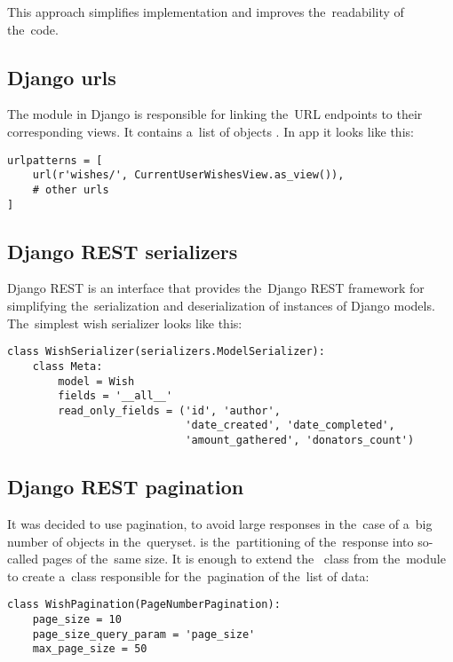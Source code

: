 This approach simplifies implementation and improves the~readability of the~code.


\subsection{Django urls}
The  module in Django is responsible for linking the~\ac{URL} endpoints to their corresponding views.
It contains a~list of objects . In  app it looks like this:

\begin{lstlisting}
urlpatterns = [
    url(r'wishes/', CurrentUserWishesView.as_view()),
    # other urls
]
\end{lstlisting}


\subsection{Django REST serializers}
Django REST  is an interface that provides the~Django REST framework for simplifying
the~serialization and deserialization of instances of Django models. The~simplest wish serializer looks like this:

\begin{lstlisting}
class WishSerializer(serializers.ModelSerializer):
    class Meta:
        model = Wish
        fields = '__all__'
        read_only_fields = ('id', 'author',
                            'date_created', 'date_completed',
                            'amount_gathered', 'donators_count')
\end{lstlisting}
\pagebreak

\subsection{Django REST pagination}
It was decided to use pagination, to avoid large responses in the~case of a~big number of objects in the~queryset.
 is the~partitioning of the~response into so-called pages of the~same size. It is enough to
extend the~ class from the~module  to create
a~class respon\-sible for the~pagination of the~list of data:

\begin{lstlisting}
class WishPagination(PageNumberPagination):
    page_size = 10
    page_size_query_param = 'page_size'
    max_page_size = 50
\end{lstlisting}

